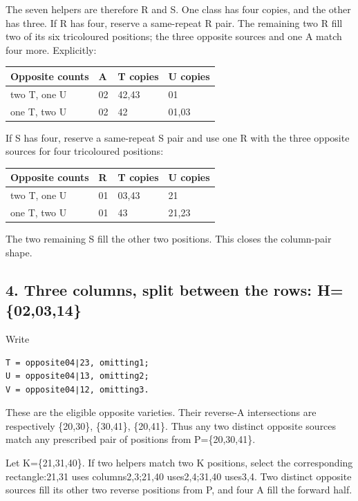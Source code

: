 \documentclass[
  10pt,
]{article}
\begin{document}
The seven helpers are therefore R and S. One class has four copies, and
the other has three. If R has four, reserve a same-repeat R pair. The
remaining two R fill two of its six tricoloured positions; the three
opposite sources and one A match four more. Explicitly:

\begin{longtable}[]{@{}llll@{}}
\toprule\noalign{}
Opposite counts & A & T copies & U copies \\
\midrule\noalign{}
\endhead
\bottomrule\noalign{}
\endlastfoot
two T, one U & 02 & 42,43 & 01 \\
one T, two U & 02 & 42 & 01,03 \\
\end{longtable}

If S has four, reserve a same-repeat S pair and use one R with the three
opposite sources for four tricoloured positions:

\begin{longtable}[]{@{}llll@{}}
\toprule\noalign{}
Opposite counts & R & T copies & U copies \\
\midrule\noalign{}
\endhead
\bottomrule\noalign{}
\endlastfoot
two T, one U & 01 & 03,43 & 21 \\
one T, two U & 01 & 43 & 21,23 \\
\end{longtable}

The two remaining S fill the other two positions. This closes the
column-pair shape.

\hypertarget{three-columns-split-between-the-rows-h020314}{%
\subsection*{4. Three columns, split between the rows:
H=\{02,03,14\}}\label{three-columns-split-between-the-rows-h020314}}

Write

\begin{verbatim}
T = opposite04∣23, omitting1;
U = opposite04∣13, omitting2;
V = opposite04∣12, omitting3.
\end{verbatim}

These are the eligible opposite varieties. Their reverse-A intersections
are respectively \{20,30\}, \{30,41\}, \{20,41\}. Thus any two distinct
opposite sources match any prescribed pair of positions from
P=\{20,30,41\}.

Let K=\{21,31,40\}. If two helpers match two K positions, select the
corresponding rectangle:21,31 uses columns2,3;21,40 uses2,4;31,40
uses3,4. Two distinct opposite sources fill its other two reverse
positions from P, and four A fill the forward half.
\end{document}
